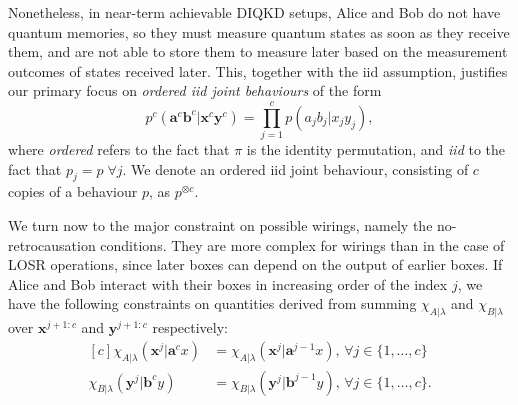 \documentclass[10pt, a4paper]{article}
\numberwithin{equation}{section} %
\theoremstyle{definition}
\theoremstyle{plain}
\newcommand{\dintv}[2]{\mathopen\{#1,\ldots,#2\mathclose\}}
\newcommand{\?}{\mathrel{?}} %
\newcommand{\cvec}[1]{\boldsymbol{\mathbf{#1}}}    %
\begin{document}
                  Nonetheless, in near-term achievable DIQKD setups, Alice and Bob do not have quantum memories, so they must measure quantum states as soon as they receive them, and are not able to store them to measure later based on the measurement outcomes of states received later. This, together with the iid assumption, justifies our primary focus on \emph{ordered iid joint behaviours} of the form
                  \begin{equation}
                     p^c(\cvec{a}^c\cvec{b}^c|\cvec{x}^c\cvec{y}^c) = \prod_{j=1}^c p(a_jb_j|x_jy_j),
                  \end{equation}
                  where \emph{ordered} refers to the fact that \(\pi\) is the identity permutation, and \emph{iid} to the fact that \(p_j = p\;\forall j\). We denote an ordered iid joint behaviour, consisting of \(c\) copies of a behaviour \(p\), as \(p^{\otimes c}\).

              We turn now to the major constraint on possible wirings, namely the no-retrocausation conditions. They are more complex for wirings than in the case of LOSR operations, since later boxes can depend on the output of earlier boxes. If Alice and Bob interact with their boxes in increasing order of the index \(j\), we have the following constraints on quantities derived from summing \(\chi_{A|\lambda}\) and \(\chi_{B|\lambda}\) over \(\cvec{x}^{j+1:c}\) and \(\cvec{y}^{j+1:c}\) respectively:
              \begin{equation}
                \begin{aligned}[c]
                  \chi_{A|\lambda}(\cvec{x}^j|\cvec{a}^cx) &= \chi_{A|\lambda}(\cvec{x}^j|\cvec{a}^{j-1}x),\,\forall j \in \dintv{1}{c} \\
                  \chi_{B|\lambda}(\cvec{y}^j|\cvec{b}^cy) &= \chi_{B|\lambda}(\cvec{y}^j|\cvec{b}^{j-1}y),\,\forall j \in \dintv{1}{c}.
                \end{aligned}\label{eqn:wiringnoretro}
              \end{equation}
\end{document}
